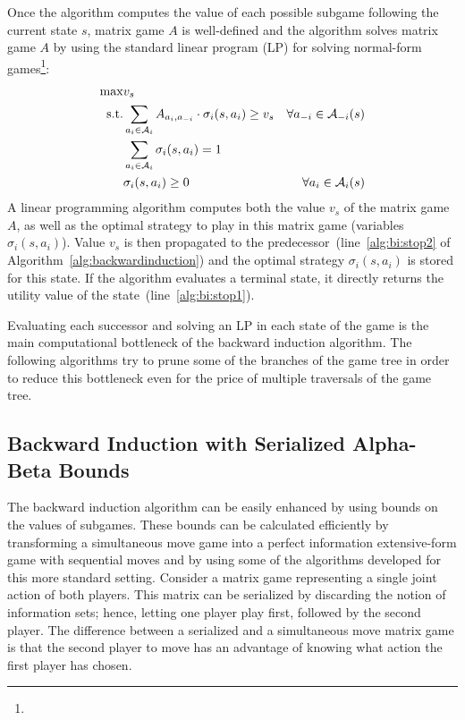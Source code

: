 Once the algorithm computes the value of each possible subgame following the current state $s$, matrix game $A$ is well-defined and the algorithm
solves matrix game $A$ by using the standard linear program (LP) for solving normal-form games\footnote{}:
\begin{eqnarray}
\max & v_s & \\
\textrm{s.t.} & \sum_{a_i \in \mathcal{A}_{i}}A_{a_i,a_{-i}} \cdot \sigma_i(s,a_i) \geq v_s & \forall a_{-i} \in \mathcal{A}_{-i}(s)\\
& \sum_{a_{i} \in \mathcal{A}_{i}} \sigma_i(s,a_{i}) = 1 \\
& \sigma_i(s,a_{i}) \geq 0 & \forall a_{i} \in \mathcal{A}_{i}(s)
\end{eqnarray}
A linear programming algorithm computes both the value $v_s$ of the matrix game $A$, as well as the optimal strategy to play in this matrix game (variables $\sigma_i(s,a_i)$).
Value $v_s$ is then propagated to the predecessor~(line~\ref{alg:bi:stop2} of Algorithm~\ref{alg:backwardinduction}) and the optimal strategy $\sigma_i(s,a_i)$ is stored for this state.
If the algorithm evaluates a terminal state, it directly returns the utility value of the state~(line~\ref{alg:bi:stop1}).

Evaluating each successor and solving an LP in each state of the game is the main computational bottleneck of the backward induction algorithm.
The following algorithms try to prune some of the branches of the game tree in order to reduce this bottleneck even for the price of multiple traversals of the game tree.

\subsection{Backward Induction with Serialized Alpha-Beta Bounds}\label{sec:algs:biab}

The backward induction algorithm can be easily enhanced by using bounds on the values of subgames.
These bounds can be calculated efficiently by transforming a simultaneous move game into a perfect information extensive-form 
game with sequential moves and by using some of the algorithms developed for this more standard setting.
Consider a matrix game representing a single joint action of both players.
This matrix can be serialized by discarding the notion of information sets; hence, letting one player play first, followed by the second player.
The difference between a serialized and a simultaneous move matrix game is that the second player to move has an advantage of knowing what action the first player has chosen.

